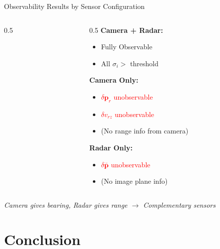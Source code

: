 \documentclass{beamer}
\newcommand{\pr}{\mathbf{p}_r}
\newcommand{\pbar}{\bar{\mathbf{p}}}
\begin{document}
\begin{frame}{Observability Results by Sensor Configuration}
\begin{columns}
\begin{column}{0.5\textwidth}
\centering
\end{column}

\begin{column}{0.5\textwidth}
\textbf{Camera + Radar:}
\begin{itemize}
    \item \textcolor{green!70!black}{Fully Observable}
    \item All $\sigma_i > $ threshold
\end{itemize}

\vspace{0.3cm}
\textbf{Camera Only:}
\begin{itemize}
    \item \textcolor{red}{$\delta\pr$ unobservable}
    \item \textcolor{red}{$\delta v_{rz}$ unobservable}
    \item (No range info from camera)
\end{itemize}

\vspace{0.3cm}
\textbf{Radar Only:}
\begin{itemize}
    \item \textcolor{red}{$\delta\pbar$ unobservable}
    \item (No image plane info)
\end{itemize}
\end{column}
\end{columns}

\vspace{0.3cm}
\small\textit{Camera gives bearing, Radar gives range $\rightarrow$ Complementary sensors}
\end{frame}

\section{Conclusion}
\end{document}
